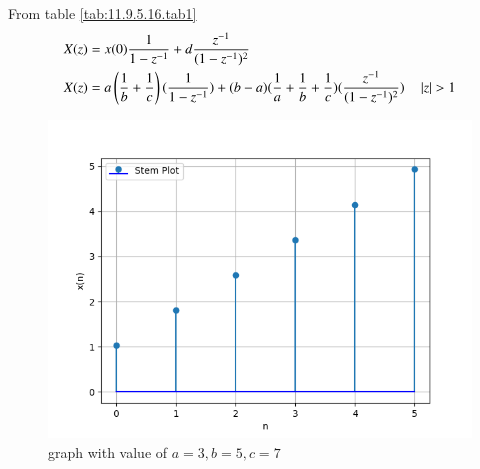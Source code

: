 \documentclass[journal,12pt,onecolumn]{IEEEtran}
\theoremstyle{remark}
\begin{document}
From table \ref{tab:11.9.5.16.tab1}
\begin{align}
X(z) &= x(0)\frac{1}{1- z^{-1}} + d\frac{z^{-1}}{(1-z^{-1})^2} \\
X(z) &= a\left(\frac{1}{b} + \frac{1}{c}\right)(\frac{1}{1- z^{-1}}) + (b - a)(\frac{1}{a} + \frac{1}{b} + \frac{1}{c})(\frac{z^{-1}}{(1-z^{-1})^2}) \quad \left\vert z\right\vert > 1
\end{align}

\begin{figure}[h]
    \centering
    \includegraphics[width=\columnwidth]{./figs/fig1.png}
    \caption{graph with value of $a = 3, b = 5, c = 7$ }
\end{figure}
\end{document}
